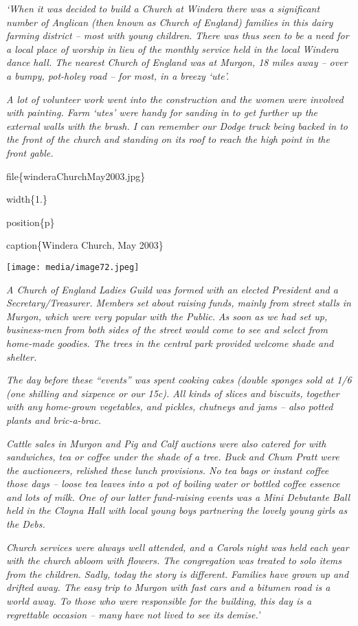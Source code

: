\emph{`When it was decided to build a Church at Windera there was a significant number of Anglican (then known as Church of England) families in this dairy farming district -- most with young children. There was thus seen to be a need for a local place of worship in lieu of the monthly service held in the local Windera dance hall. The nearest Church of England was at Murgon, 18 miles away -- over a bumpy, pot-holey road -- for most, in a breezy `ute'.}

\emph{A lot of volunteer work went into the construction and the women were involved with painting. Farm `utes' were handy for sanding in to get further up the external walls with the brush. I can remember our Dodge truck being backed in to the front of the church and standing on its roof to reach the high point in the front gable.}

file\{winderaChurchMay2003.jpg\}

width\{1.\}

position\{p\}

caption\{Windera Church, May 2003\}

\texttt{[image: media/image72.jpeg]}

\emph{A Church of England Ladies Guild was formed with an elected President and a Secretary/Treasurer. Members set about raising funds, mainly from street stalls in Murgon, which were very popular with the Public.} \emph{As soon as we had set up, business-men from both sides of the street would come to see and select from home-made goodies. The trees in the central park provided welcome shade and shelter.}

\emph{The day before these ``events'' was spent cooking cakes (double sponges sold at 1/6 (one shilling and sixpence or our 15c). All kinds of slices and biscuits, together with any home-grown vegetables, and pickles, chutneys and jams -- also potted plants and bric-a-brac.}

\emph{Cattle sales in Murgon and Pig and Calf auctions were also catered for with sandwiches, tea or coffee under the shade of a tree. Buck and Chum Pratt were the auctioneers, relished these lunch provisions. No tea bags or instant coffee those days -- loose tea leaves into a pot of boiling water or bottled coffee essence and lots of milk. One of our latter fund-raising events was a Mini Debutante Ball held in the Cloyna Hall with local young boys partnering the lovely young girls as the Debs.}

\emph{Church services were always well attended, and a Carols night was held each year with the church abloom with flowers. The congregation was treated to solo items from the children. Sadly, today the story is different. Families have grown up and drifted away. The easy trip to Murgon with fast cars and a bitumen road is a world away. To those who were responsible for the building, this day is a regrettable occasion -- many have not lived to see its demise.'}

